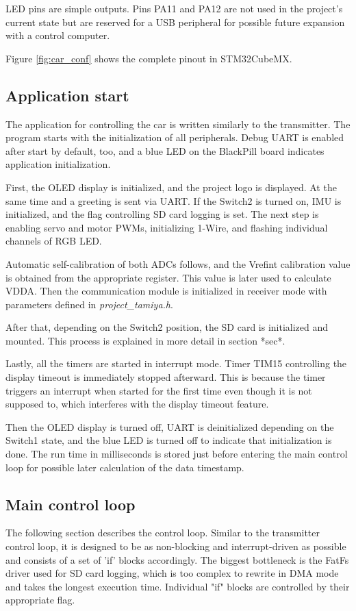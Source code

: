 LED pins are simple outputs. Pins PA11 and PA12 are not used in the project's current state but are reserved for a USB peripheral for possible future expansion with a control computer.

Figure \ref{fig:car_conf} shows the complete pinout in STM32CubeMX.

\subsection{Application start}
The application for controlling the car is written similarly to the transmitter. The program starts with the initialization of all peripherals. Debug UART is enabled after start by default, too, and a blue LED on the BlackPill board indicates application initialization.

First, the OLED display is initialized, and the project logo is displayed. At the same time and a greeting is sent via UART. If the Switch2 is turned on, IMU is initialized, and the flag controlling SD card logging is set. The next step is enabling servo and motor PWMs, initializing 1-Wire, and flashing individual channels of RGB LED.

Automatic self-calibration of both ADCs follows, and the Vrefint calibration value is obtained from the appropriate register. This value is later used to calculate VDDA. Then the communication module is initialized in receiver mode with parameters defined in \textit{project\_tamiya.h}.

After that, depending on the Switch2 position, the SD card is initialized and mounted. This process is explained in more detail in section *sec*.

Lastly, all the timers are started in interrupt mode. Timer TIM15 controlling the display timeout is immediately stopped afterward. This is because the timer triggers an interrupt when started for the first time even though it is not supposed to, which interferes with the display timeout feature.

Then the OLED display is turned off, UART is deinitialized depending on the Switch1 state, and the blue LED is turned off to indicate that initialization is done. The run time in milliseconds is stored just before entering the main control loop for possible later calculation of the data timestamp.

\subsection{Main control loop}
The following section describes the control loop. Similar to the transmitter control loop, it is designed to be as non-blocking and interrupt-driven as possible and consists of a set of 'if' blocks accordingly. The biggest bottleneck is the FatFs driver used for SD card logging, which is too complex to rewrite in DMA mode and takes the longest execution time. Individual "if" blocks are controlled by their appropriate flag.

